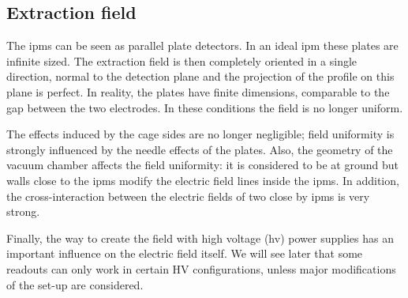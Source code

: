 \begin{refsection}
  
  \FloatBarrier
  \section{Extraction field}
  
  The \acrshort{ipm}s can be seen as parallel plate detectors. In an ideal \acrshort{ipm} these plates are infinite sized. The extraction field is then completely oriented in a single direction, normal to the detection plane and the projection of the profile on this plane is perfect. In reality, the plates have finite dimensions, comparable to the gap between the two electrodes. In these conditions the field is no longer uniform.

  The effects induced by the cage sides are no longer negligible; field uniformity is strongly influenced by the needle effects of the plates.
  Also, the geometry of the vacuum chamber affects the field uniformity: it is considered to be at ground but walls close to the \acrshort{ipm}s modify the electric field lines inside the \acrshort{ipm}s. In addition, the cross-interaction between the electric fields of two close by \acrshort{ipm}s is very strong.

  Finally, the way to create the field with high voltage (\acrshort{hv}) power supplies has an important influence on the electric field itself. We will see later that some readouts can only work in certain HV configurations, unless major modifications of the set-up are considered.


\end{refsection}
